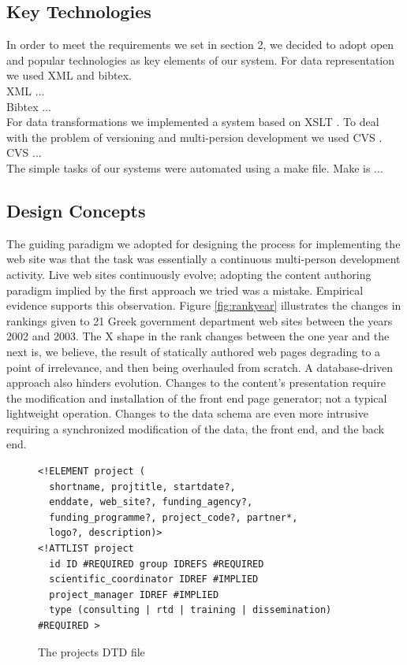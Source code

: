 \documentclass[10pt]{article}
\begin{document}
\subsection{Key Technologies}

In order to meet the requirements we set in section 2, we decided to adopt open and popular
technologies as key elements of our system. For data representation we used XML and bibtex.\\
XML \cite{W3C_XML} ...\\
Bibtex \cite{Pa88} \cite{Ja99} ...\\
For data transformations we implemented a system based on XSLT \cite{W3C_XSLT}.
To deal with the problem of versioning and multi-persion development we used CVS \cite{CVS}. CVS ...\\
The simple tasks of our systems were automated using a make file. Make \cite{gnu_make} is ...\\

\subsection{Design Concepts}

The guiding paradigm we adopted for designing the process
for implementing the web site was that the task was essentially
a continuous multi-person development activity.
Live web sites continuously evolve;
adopting the content authoring paradigm implied
by the first approach we tried was a mistake.
Empirical evidence supports this observation.
Figure \ref{fig:rankyear} illustrates the changes
in rankings given to 21 Greek government department
web sites between the years 2002 and 2003.
The X shape in the rank changes between the one year and the next
is, we believe, the result of statically authored web pages
degrading to a point of irrelevance, and then being overhauled
from scratch.
A database-driven approach also hinders evolution.
Changes to the content's presentation require the modification
and installation of the front end page generator;
not a typical lightweight operation.
Changes to the data schema are even more intrusive
requiring a synchronized modification of the data,
the front end, and the back end.

\begin{figure}
\lstset{language=XML,basicstyle=\ttfamily}
{\begin{lstlisting}
<!ELEMENT project (
  shortname, projtitle, startdate?, 
  enddate, web_site?, funding_agency?, 
  funding_programme?, project_code?, partner*,
  logo?, description)>
<!ATTLIST project
  id ID #REQUIRED group IDREFS #REQUIRED
  scientific_coordinator IDREF #IMPLIED
  project_manager IDREF #IMPLIED
  type (consulting | rtd | training | dissemination) #REQUIRED >
\end{lstlisting}}
\caption{The projects DTD file}
\label{fig:project-dtd}
\end{figure}
\end{document}
